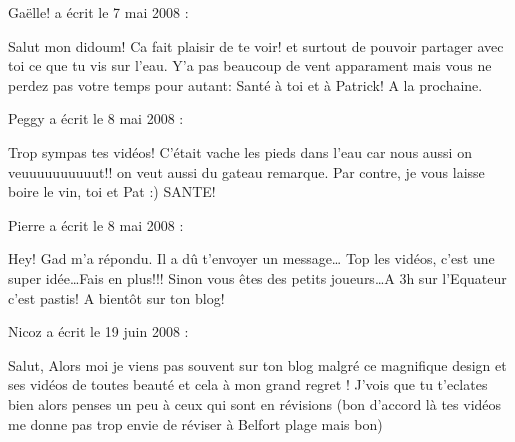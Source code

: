\medskip
Gaëlle! a écrit le 7 mai 2008 :
\begin{displayquote}
Salut mon didoum!
Ca fait plaisir de te voir! et surtout de pouvoir partager avec toi ce que tu vis sur l'eau.
Y'a pas beaucoup de vent apparament mais vous ne perdez pas votre temps pour autant: Santé à toi et à Patrick!
A la prochaine.
\end{displayquote}

\medskip
Peggy a écrit le 8 mai 2008 :
\begin{displayquote}
Trop sympas tes vidéos!
C'était vache les pieds dans l'eau car nous aussi on veuuuuuuuuuut!! on veut aussi du gateau remarque.
Par contre, je vous laisse boire le vin, toi et Pat :) SANTE!
\end{displayquote}

\medskip
Pierre a écrit le 8 mai 2008 :
\begin{displayquote}
Hey!
Gad m'a répondu. Il a dû t'envoyer un message\dots
Top les vidéos, c'est une super idée\dots Fais en plus!!!
Sinon vous êtes des petits joueurs\dots A 3h sur l'Equateur c'est pastis!
A bientôt sur ton blog!
\end{displayquote}

\medskip
Nicoz a écrit le 19 juin 2008 :
\begin{displayquote}
Salut,
Alors moi je viens pas souvent sur ton blog malgré ce magnifique design et ses vidéos de toutes beauté et cela à mon grand regret !
J'vois que tu t'eclates bien alors penses un peu à ceux qui sont en révisions (bon d'accord là tes vidéos me donne pas trop envie de réviser à Belfort plage mais bon)
\end{displayquote}

\vfill
